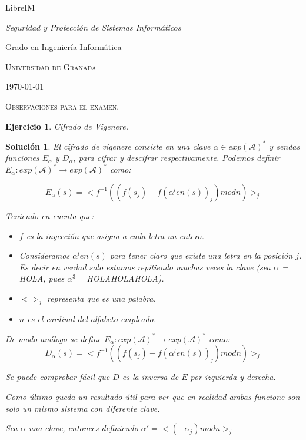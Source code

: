 \documentclass[
  a4paper,
  spanish,
  12pt,
]{scrartcl}
\theoremstyle{ejercicio-style}
\newtheorem{ejer}{Ejercicio}
\theoremstyle{remark-style}
\newtheorem*{sol}{Solución}
\begin{document}
\begin{flushright}
  LibreIM\vspace{.5em}

  \textit{Seguridad y Protección de Sistemas Informáticos}

  Grado en Ingeniería Informática

  \textsc{Universidad de Granada}\vspace{.5em}

  \today\vspace{.5em}
\end{flushright}

\begin{flushleft}
  \scshape\Large Observaciones para el examen.
\end{flushleft}

\begin{ejer}
  Cifrado de Vigenere.
\end{ejer}

\begin{sol}
  El cifrado de vigenere consiste en una clave $\alpha\in exp(\mathcal{A})^*$ y sendas funciones $E_\alpha$ y $D_\alpha$, para cifrar y descifrar respectivamente. Podemos definir $E_\alpha: exp(\mathcal{A})^* \to exp(\mathcal{A})^*$ como:

  $$ E_\alpha (s) = <f^{-1}( (f(s_j) + f(\alpha^len(s))_j) mod n)>_j$$

  Teniendo en cuenta que:
  \begin{itemize}
  \item $f$ es la inyección que asigna a cada letra un entero.
  \item Consideramos $\alpha^len(s)$ para tener claro que existe una letra en la posición $j$. Es decir en verdad solo estamos repitiendo muchas veces la clave (sea $\alpha$ = HOLA, pues $\alpha^3=$HOLAHOLAHOLA).
  \item $<>_j$ representa que es una palabra.
  \item $n$ es el cardinal del alfabeto empleado.
  \end{itemize}

  De modo análogo se define $E_\alpha: exp(\mathcal{A})^* \to exp(\mathcal{A})^*$ como:
  $$ D_\alpha (s) = <f^{-1}( (f(s_j) - f(\alpha^len(s))_j) mod n)>_j$$

  Se puede comprobar fácil que $D$ es la inversa de $E$ por izquierda y derecha.

  Como último queda un resultado útil para ver que en realidad ambas funcione son solo un mismo sistema con diferente clave.

  Sea $\alpha$ una clave, entonces definiendo $\alpha' = <(-\alpha_j) mod n >_j$
\end{sol}
\end{document}

